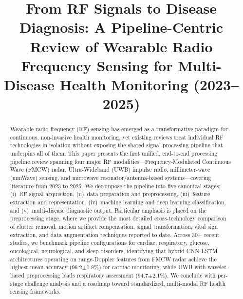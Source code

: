 \documentclass[journal,twoside]{IEEEtran}
\begin{document}
\title{From RF Signals to Disease Diagnosis: A Pipeline-Centric Review of Wearable Radio Frequency Sensing for Multi-Disease Health Monitoring (2023--2025)}

\author{
}

\maketitle

\begin{abstract}
Wearable radio frequency (RF) sensing has emerged as a transformative paradigm for continuous, non-invasive health monitoring, yet existing reviews treat individual RF technologies in isolation without exposing the shared signal-processing pipeline that underpins all of them. This paper presents the first unified, end-to-end processing pipeline review spanning four major RF modalities---Frequency-Modulated Continuous Wave (FMCW) radar, Ultra-Wideband (UWB) impulse radio, millimeter-wave (mmWave) sensing, and microwave resonator/antenna-based systems---covering literature from 2023 to 2025. We decompose the pipeline into five canonical stages: (i)~RF signal acquisition, (ii)~data preparation and preprocessing, (iii)~feature extraction and representation, (iv)~machine learning and deep learning classification, and (v)~multi-disease diagnostic output. Particular emphasis is placed on the preprocessing stage, where we provide the most detailed cross-technology comparison of clutter removal, motion artifact compensation, signal transformation, vital sign extraction, and data augmentation techniques reported to date. Across 30+ recent studies, we benchmark pipeline configurations for cardiac, respiratory, glucose, oncological, neurological, and sleep disorders, identifying that hybrid CNN-LSTM architectures operating on range-Doppler features from FMCW radar achieve the highest mean accuracy (96.2$\pm$1.8\%) for cardiac monitoring, while UWB with wavelet-based preprocessing leads respiratory assessment (94.7$\pm$2.1\%). We conclude with per-stage challenge analysis and a roadmap toward standardized, multi-modal RF health sensing frameworks.
\end{abstract}
\end{document}
